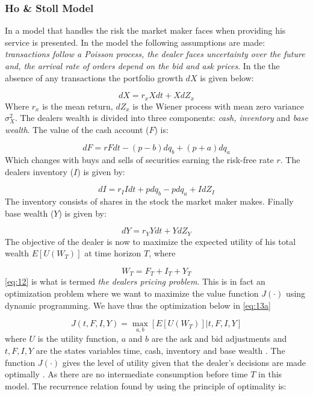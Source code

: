 \documentclass{kththesis}
\theoremstyle{definition}
\begin{document}
\subsubsection*{Ho \& Stoll Model}
In \textcite{ho1981optimal} a model that handles the risk the market maker faces when providing his service is presented. In the model the following assumptions are made: \textit{transactions follow a Poisson process, the dealer faces uncertainty over the future and, the arrival rate of orders depend on the bid and ask prices}. In the the absence of any transactions the portfolio growth $dX$ is given below:

\begin{equation}
    \label{eq:8}
    dX = r_{x}Xdt + XdZ_x
\end{equation}
Where $r_x$ is the mean return, $dZ_x$ is the Wiener process with mean zero variance $\sigma^{2}_X$. The dealers wealth is divided into three components: \textit{cash, inventory} and \textit{base wealth}. The value of the cash account ($F$) is:

\begin{equation}
    \label{eq:9}
    dF = rFdt- (p-b)dq_b + (p+a)dq_a
\end{equation}
Which changes with buys and sells of securities earning the risk-free rate $r$. The dealers inventory ($I$) is given by:

\begin{equation}
    \label{eq:10}
    dI = r_{I}Idt+pdq_{b} - pdq_{a} + IdZ_{I}
\end{equation}
The inventory consists of shares in the stock the market maker makes.
Finally base wealth ($Y$) is given by:

\begin{equation}
    \label{eq:11}
    dY = r_{Y}Ydt+YdZ_{Y} 
\end{equation}
The objective of the dealer is now to maximize the expected utility of his total wealth $E[U(W_T)]$ at time horizon $T$, where 

\begin{equation}
    \label{eq:12}
    W_{T} = F_{T} + I_{T} + Y_{T}
\end{equation}
\autoref{eq:12} is what is termed \textit{the dealers pricing problem}. This is in fact an optimization problem where we want to maximize the value function $J(\cdot)$ using dynamic programming. We have thus the optimization below in \autoref{eq:13a}

\begin{equation}
    \label{eq:13a}
    J(t,F,I,Y) = \underset{a,b}{\max}[E[U(W_T)] | t,F,I,Y]
\end{equation}
where $U$ is the utility function, $a$ and $b$ are the ask and bid adjustments and $t, F, I,Y$ are the states variables time, cash, inventory and base wealth \parencite{o1995market}. The function $J(\cdot)$ gives the level of utility given that the dealer's decisions are made optimally \parencite{o1995market}. As there are no intermediate consumption before time $T$ in this model. The recurrence relation found by using the principle of optimality is:
\end{document}
